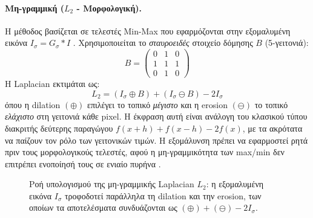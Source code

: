 \documentclass[12pt, a4paper]{article}
\begin{document}
\paragraph{Μη-γραμμική ($L_2$ - Μορφολογική).}
Η μέθοδος βασίζεται σε τελεστές Min-Max που εφαρμόζονται στην εξομαλυμένη
εικόνα $I_\sigma = G_\sigma * I$ \cite{maragos2005}. Χρησιμοποιείται το
\emph{σταυροειδές} στοιχείο δόμησης $B$ (5-γειτονιά):
\[
B = \begin{pmatrix} 0 & 1 & 0 \\ 1 & 1 & 1 \\ 0 & 1 & 0 \end{pmatrix}
\]
Η Laplacian εκτιμάται ως:
\begin{equation}
    L_2 = (I_\sigma \oplus B) + (I_\sigma \ominus B) - 2I_\sigma
\end{equation}
όπου η dilation $(\oplus)$ επιλέγει το τοπικό \emph{μέγιστο} και η erosion
$(\ominus)$ το τοπικό \emph{ελάχιστο} στη γειτονιά κάθε pixel. Η έκφραση
αυτή είναι ανάλογη του κλασικού τύπου διακριτής δεύτερης παραγώγου
$f(x{+}h)+f(x{-}h)-2f(x)$, με τα ακρότατα να παίζουν τον ρόλο των γειτονικών
τιμών. Η εξομάλυνση πρέπει να εφαρμοστεί ρητά πριν τους μορφολογικούς
τελεστές, αφού η μη-γραμμικότητα των max/min δεν επιτρέπει ενοποίησή τους
σε ενιαίο πυρήνα \cite{maragos2005}.

\begin{figure}[H]
\centering
{}
\caption{Ροή υπολογισμού της μη-γραμμικής Laplacian $L_2$: η εξομαλυμένη
         εικόνα $I_\sigma$ τροφοδοτεί παράλληλα τη dilation και την erosion,
         των οποίων τα αποτελέσματα συνδυάζονται ως $(\oplus)+(\ominus)-2I_\sigma$.}
\label{fig:l2_flow}
\end{figure}
\end{document}
